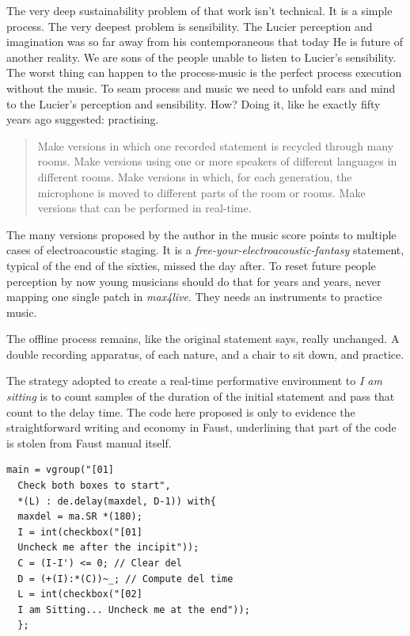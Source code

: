 \documentclass[twoside,a4paper]{article}
\begin{document}

The very deep sustainability problem of that work isn't technical. It is a simple process. The very deepest problem is sensibility. The Lucier perception and imagination was so far away from his contemporaneous that today He is future of another reality. We are sons of the people unable to listen to Lucier's sensibility. The worst thing can happen to the process-music is the perfect process execution without the music. To seam process and music we need to unfold ears and mind to the Lucier's perception and sensibility. How? Doing it, like he exactly fifty years ago suggested: practising. 

\begin{quote}
Make versions in which one recorded statement is recycled through many rooms. Make versions using one or more speakers of different languages in different rooms. Make versions in which, for each generation, the microphone is moved to different parts of the room or rooms. Make versions that can be performed in real-time. 
\end{quote}

The many versions proposed by the author in the music score points to multiple cases of electroacoustic staging. It is a \emph{free-your-electroacoustic-fantasy} statement, typical of the end of the sixties, missed the day after. To reset future people perception by now young musicians should do that for years and years, never mapping one single patch in \emph{max4live}. They needs an instruments to practice music. 

The offline process remains, like the original statement says, really unchanged. A double recording apparatus, of each nature, and a chair to sit down, and practice. 

The strategy adopted to create a real-time performative environment to \emph{I am sitting} is to count samples of the duration of the initial statement and pass that count to the delay time. The code here proposed is only to evidence the straightforward writing and economy in Faust, underlining that part of the code is stolen from Faust manual itself. 

\begin{lstlisting}
main = vgroup("[01]
  Check both boxes to start",
  *(L) : de.delay(maxdel, D-1)) with{
  maxdel = ma.SR *(180);
  I = int(checkbox("[01]
  Uncheck me after the incipit"));
  C = (I-I') <= 0; // Clear del
  D = (+(I):*(C))~_; // Compute del time
  L = int(checkbox("[02]
  I am Sitting... Uncheck me at the end"));
  };
\end{lstlisting}
\end{document}
